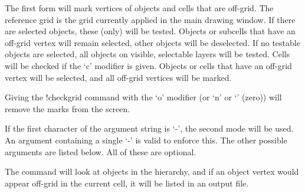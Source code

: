The first form will mark vertices of objects and cells that are
off-grid.  The reference grid is the grid currently applied in the
main drawing window.  If there are selected objects, these (only) will
be tested.  Objects or subcells that have an off-grid vertex will
remain selected, other objects will be deselected.  If no testable
objects are selected, all objects on visible, selectable layers will
be tested.  Cells will be checked if the `{\vt c}' modifier is given. 
Objects or cells that have an off-grid vertex will be selected, and
all off-grid vertices will be marked.

Giving the {\cb !checkgrid} command with the `{\vt o}' modifier (or
`{\vt n}' or `{}' (zero)) will remove the marks from the screen.

If the first character of the argument string is `{\vt -}', the second
mode will be used.  An argument containing a single `{\vt -}' is valid
to enforce this.  The other possible arguments are listed below.  All
of these are optional.

The command will look at objects in the hierarchy, and if an object
vertex would appear off-grid in the current cell, it will be listed in
an output file.

